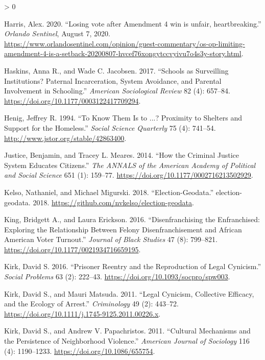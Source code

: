 \documentclass[
  12pt,
]{article}
\newlength{\cslhangindent}
\newenvironment{CSLReferences}[2] %
 {%
  \setlength{\parindent}{0pt}
  \ifodd #1 \everypar{\setlength{\hangindent}{\cslhangindent}}\ignorespaces\fi
  \ifnum #2 > 0
  \setlength{\parskip}{#2\baselineskip}
  \fi
 }%
 {}
\begin{document}
\begin{CSLReferences}{1}{0}
\leavevmode\hypertarget{ref-Harris2020}{}%
Harris, Alex. 2020. {``Losing vote after Amendment 4 win is unfair, heartbreaking.''} \emph{Orlando Sentinel}, August 7, 2020. \url{https://www.orlandosentinel.com/opinion/guest-commentary/os-op-limiting-amendment-4-is-a-setback-20200807-hvcef76xongytccvyivu7o4s3y-story.html}.

\leavevmode\hypertarget{ref-Haskins2017}{}%
Haskins, Anna R., and Wade C. Jacobsen. 2017. {``Schools as {Surveilling Institutions}? {Paternal Incarceration}, {System Avoidance}, and {Parental Involvement} in {Schooling}.''} \emph{American Sociological Review} 82 (4): 657--84. \url{https://doi.org/10.1177/0003122417709294}.

\leavevmode\hypertarget{ref-Henig1994}{}%
Henig, Jeffrey R. 1994. {``To {Know Them Is} to ...? {Proximity} to {Shelters} and {Support} for the {Homeless}.''} \emph{Social Science Quarterly} 75 (4): 741--54. \url{http://www.jstor.org/stable/42863400}.

\leavevmode\hypertarget{ref-Justice2014}{}%
Justice, Benjamin, and Tracey L. Meares. 2014. {``How the {Criminal Justice System Educates Citizens}.''} \emph{The ANNALS of the American Academy of Political and Social Science} 651 (1): 159--77. \url{https://doi.org/10.1177/0002716213502929}.

\leavevmode\hypertarget{ref-Kelso2018}{}%
Kelso, Nathaniel, and Michael Migurski. 2018. {``Election-Geodata.''} {election-geodata}. 2018. \url{https://github.com/nvkelso/election-geodata}.

\leavevmode\hypertarget{ref-King2016}{}%
King, Bridgett A., and Laura Erickson. 2016. {``Disenfranchising the {Enfranchised}: {Exploring} the {Relationship Between Felony Disenfranchisement} and {African American Voter Turnout}.''} \emph{Journal of Black Studies} 47 (8): 799--821. \url{https://doi.org/10.1177/0021934716659195}.

\leavevmode\hypertarget{ref-Kirk2016}{}%
Kirk, David S. 2016. {``Prisoner {Reentry} and the {Reproduction} of {Legal Cynicism}.''} \emph{Social Problems} 63 (2): 222--43. \url{https://doi.org/10.1093/socpro/spw003}.

\leavevmode\hypertarget{ref-Kirk2011}{}%
Kirk, David S., and Mauri Matsuda. 2011. {``Legal {Cynicism}, {Collective Efficacy}, and the {Ecology} of {Arrest}.''} \emph{Criminology} 49 (2): 443--72. \url{https://doi.org/10.1111/j.1745-9125.2011.00226.x}.

\leavevmode\hypertarget{ref-Kirk2011a}{}%
Kirk, David S., and Andrew V. Papachristos. 2011. {``Cultural {Mechanisms} and the {Persistence} of {Neighborhood Violence}.''} \emph{American Journal of Sociology} 116 (4): 1190--1233. \url{https://doi.org/10.1086/655754}.


\end{CSLReferences}
\end{document}
